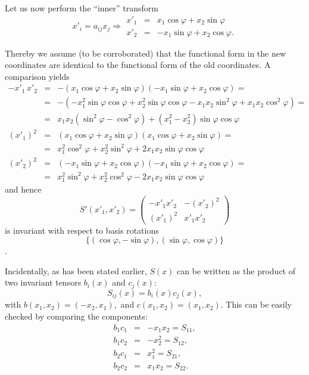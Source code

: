 {Let us now perform the ``inner'' transform
$$
  x'_i =a_{ij}x_j \Longrightarrow
  \begin{array}{rcl}
    x'_1 & = & x_1 \cos \varphi + x_2 \sin \varphi \\
    x'_2 & = & -x_1 \sin \varphi + x_2 \cos \varphi .
  \end{array}
$$

Thereby we assume (to be corroborated) that the functional form in the new coordinates are identical
to the functional form of the old coordinates.
A comparison yields
\begin{eqnarray*}
  -x'_1 \,x'_2 & = &
  -\left(x_1 \cos \varphi + x_2 \sin \varphi \right)
  \left(-x_1 \sin \varphi + x_2 \cos \varphi \right) = \\
  & = &
  -\left(
    -x_1^2 \sin \varphi \cos \varphi +
      x_2^2 \sin \varphi \cos \varphi -
      x_1 x_2 \sin^2 \varphi + x_1 x_2 \cos^2 \varphi
  \right) = \\
  & = &
  x_1 x_2 \left(\sin^2 \varphi - \cos^2 \varphi \right) +
    \left(x_1^2 - x_2^2\right) \sin \varphi \cos \varphi \\
  (x'_1)^2  & = &
    \left(x_1 \cos \varphi + x_2 \sin \varphi \right)
    \left(x_1 \cos \varphi + x_2 \sin \varphi \right) = \\
  & = & x_1^2 \cos^2 \varphi + x_2^2 \sin^2 \varphi +
    2 x_1 x_2 \sin \varphi \cos \varphi \\
  (x'_2)^2  & = &
    \left(-x_1 \sin \varphi + x_2 \cos \varphi \right)
    \left(-x_1 \sin \varphi + x_2 \cos \varphi \right) = \\
  & = & x_1^2 \sin^2 \varphi + x_2^2 \cos^2 \varphi -
    2 x_1 x_2 \sin \varphi \cos \varphi
\end{eqnarray*}
and hence
$$S' (x'_1,x'_2)=\left(
    \begin{array}{cc}
      -x'_1x'_2 & -(x'_2)^2 \\
      (x'_1)^2   & x'_1x'_2
    \end{array}
\right)
$$ is invariant with respect to basis rotations $$\{ (\cos \varphi ,-\sin \varphi
),(\sin
\varphi ,\cos \varphi )\}$$.


Incidentally,
as has been stated earlier, $S(x)$ can be written as the product of two invariant tensors $b_i(x)$ and $c_j(x)$:
$$S_{ij}(x)=b_i(x)c_j(x),$$
with
$
b(x_1,x_2)=(-x_2,x_1),
$ and
$
c(x_1,x_2)=(x_1,x_2)
$.
This can be easily checked by comparing the components:
\begin{eqnarray*}
b_1c_1&=&-x_1x_2 = S_{11},\\
b_1c_2&=&-x_2^2 = S_{12},\\
b_2c_1&=&x_1^2 = S_{21},\\
b_2c_2&=&x_1x_2 = S_{22}.\\
\end{eqnarray*}

}
